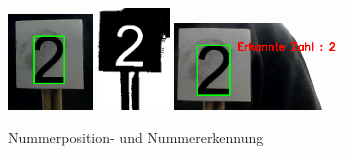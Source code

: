 \documentclass[../../main.tex]{subfiles}
\begin{document}
     \begin{figure}[H] %
        \centering
        \includegraphics[width=0.2\textwidth]{number_location.png}
        \hspace{1cm}
        \includegraphics[width=0.17\textwidth]{number_thres.png}
        \hspace{1cm}
        \includegraphics[width=0.4\textwidth]{number_reco.png}
        \caption{Nummerposition- und Nummererkennung}
        \label{fig:tafelerkennung}
    \end{figure}
\end{document}
